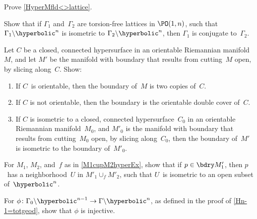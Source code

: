 \begin{exercises}

\item \label{HyperMfld<>latticePfEx}
 Prove \cref{HyperMfld<>lattice}.

\item \label{HyperMfld->UniqueLatt}
 Show that if $\Gamma_1$ and~$\Gamma_2$ are torsion-free
lattices in $\PO(1,n)$, such that $\Gamma_1 \backslash
\hyperbolic^n$ is isometric to $\Gamma_2 \backslash
\hyperbolic^n$, then $\Gamma_1$ is conjugate to~$\Gamma_2$.

 \item \label{NonOrientDblCover}
 Let $C$ be a closed, connected hypersurface in an
orientable Riemannian manifold~$M$, and let $M'$ be the
manifold with boundary that results from cutting~$M$ open,
by slicing along~$C$. Show:
 \begin{enumerate}
 \item If $C$~is orientable, then the boundary of~$M$ is
two copies of~$C$.
 \item If $C$ is not orientable, then the boundary is the
orientable double cover of~$C$.
 \item If $C$ is isometric to a closed, connected
hypersurface~$C_0$ in an orientable Riemannian
manifold~$M_0$, and $M'_0$ is the manifold with boundary
that results from cutting~$M_0$ open, by slicing
along~$C_0$, then the boundary of~$M'$ is isometric to the
boundary of~$M'_0$.
 \end{enumerate}

\item \label{M1cupM2hyperEx}
 For $M_1$, $M_2$, and~$f$ as in
\cref{M1cupM2hyperEx}, show that if $p \in \bdry
M'_1$, then $p$~has a neighborhood~$U$ in $M'_1 \cup_f
M'_2$, such that $U$~is isometric to an open subset
of~$\hyperbolic^n$.

\item \label{Hn-1=totgeodPfinj}
 For $\phi \colon \Gamma_0 \backslash
\hyperbolic^{n-1} \to \Gamma \backslash \hyperbolic^n$, as defined in the proof of \cref{Hn-1=totgeod}, show that $\phi$ is
injective.


\end{exercises}
